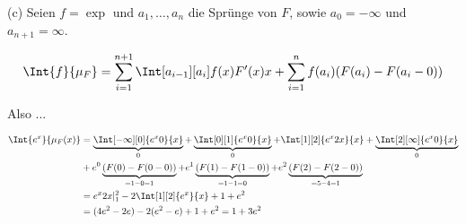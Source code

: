 \begin{solution}
(c) Seien $f = \exp$ und $a_1, \ldots, a_n$ die Sprünge von $F$, sowie $a_0 = - \infty$ und $a_{n+1} = \infty$.

\begin{align*}
  \Int{f}{\mu_F}
  =
  \sum_{i=1}^{n+1} \Int[a_{i-1}][a_i]{f(x) F^\prime(x)}{x} +
  \sum_{i=1}^n f(a_i) (F(a_i) - F(a_i - 0))
\end{align*}

Also ...

\begin{align*}
  \Int{e^x}{\mu_F(x)}
  & =
  \underbrace{\Int[-\infty][0]{e^x 0}{x}}_0
  +
  \underbrace{\Int[0][1]{e^x 0}{x}}_0
  +
  \Int[1][2]{e^x 2x}{x}
  +
  \underbrace{\Int[2][\infty]{e^x 0}{x}}_0 \\
  & +
  e^0 \underbrace{(F(0) - F(0 - 0))}_{= 1-0 = 1}
  +
  e^1 \underbrace{(F(1) - F(1 - 0))}_{= 1-1 = 0}
  +
  e^2 \underbrace{(F(2) - F(2 - 0))}_{= 5-4 = 1} \\
  & =
  e^x 2x |_1^2 - 2 \Int[1][2]{e^x}{x} + 1 + e^2 \\
  & =
  (4e^2 - 2e) - 2 (e^2 - e) + 1 + e^2
  =
  1 + 3e^2
\end{align*}

\end{solution}
